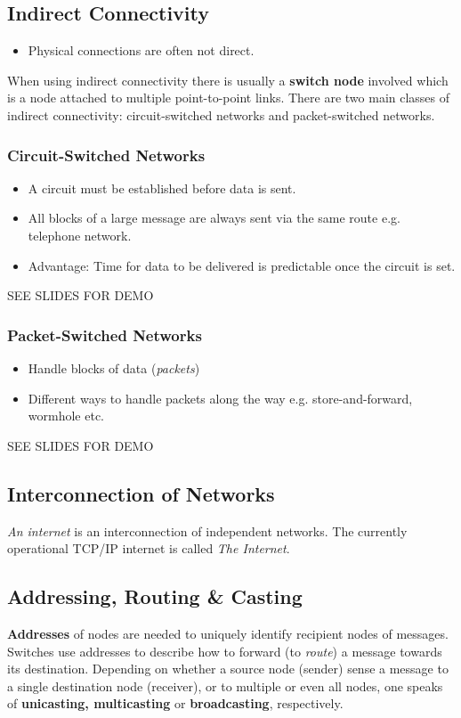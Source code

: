 \documentclass{article}%
\begin{document}
\subsection{Indirect Connectivity}
\label{sec:org62cd7e8}
\begin{itemize}
\item Physical connections are often not direct.
\end{itemize}
When using indirect connectivity there is usually a \textbf{switch node} involved which is a node attached to multiple point-to-point links.
There are two main classes of indirect connectivity: circuit-switched networks and packet-switched networks.

\subsubsection{Circuit-Switched Networks}
\label{sec:org3f6c490}
\begin{itemize}
\item A circuit must be established before data is sent.
\item All blocks of a large message are always sent via the same route e.g. telephone network.
\item Advantage: Time for data to be delivered is predictable once the circuit is set.
\end{itemize}
SEE SLIDES FOR DEMO

\subsubsection{Packet-Switched Networks}
\label{sec:orgd794909}
\begin{itemize}
\item Handle blocks of data (\emph{packets})
\item Different ways to handle packets along the way e.g. store-and-forward, wormhole etc.
\end{itemize}
SEE SLIDES FOR DEMO

\subsection{Interconnection of Networks}
\label{sec:org5952d75}
\emph{An internet} is an interconnection of independent networks.
The currently operational TCP/IP internet is called \emph{The Internet}.

\subsection{Addressing, Routing \& Casting}
\label{sec:orgdbe2976}
\textbf{Addresses} of nodes are needed to uniquely identify recipient nodes of messages.
Switches use addresses to describe how to forward (to \emph{route}) a message towards its destination.
Depending on whether a source node (sender) sense a message to a single destination node (receiver), or to multiple or even all nodes, one speaks of \textbf{unicasting, multicasting} or \textbf{broadcasting}, respectively.
\end{document}
